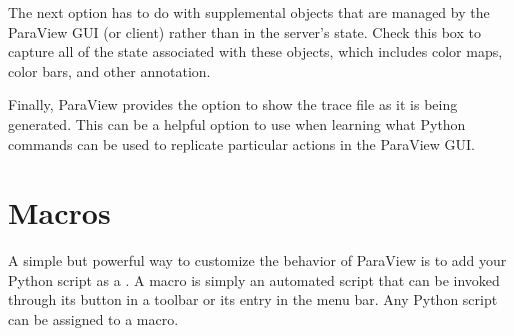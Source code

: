 The next option has to do with supplemental objects that are managed by the
ParaView GUI (or client) rather than in the server's state. Check this box
to capture all of the state associated with these objects, which includes
color maps, color bars, and other annotation.

Finally, ParaView provides the option to show the trace file as it is being
generated. This can be a helpful option to use when learning what Python
commands can be used to replicate particular actions in the ParaView GUI.


\section{Macros}
\label{sec:Macros}


A simple but powerful way to customize the behavior of ParaView is to
add your Python script as a .  A macro is simply an 
automated script that can
be invoked through its button in a toolbar or its entry in the menu bar.
Any Python script can be assigned to a macro.

